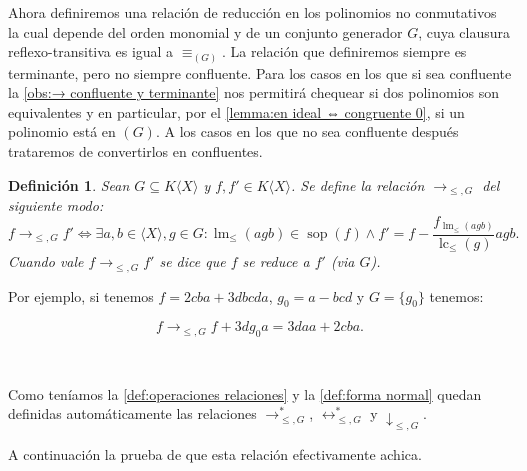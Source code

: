 \documentclass[12pt]{report}
\theoremstyle{customstyle}
\newtheorem{definition}[theorem]{Definición}
\theoremstyle{factstyle}
\DeclareMathOperator{\sop}{sop}
\DeclareMathOperator{\lm}{lm}
\DeclareMathOperator{\lc}{lc}
\begin{document}
Ahora definiremos una relación de reducción en los polinomios no conmutativos la cual depende del orden monomial y de un conjunto generador $G$, cuya clausura reflexo-transitiva es igual a $≡_{(G)}$. La relación que definiremos siempre es terminante, pero no siempre confluente. Para los casos en los que si sea confluente la \cref{obs:→ confluente y terminante} nos permitirá chequear si dos polinomios son equivalentes y en particular, por el \cref{lemma:en ideal ⇔ congruente 0}, si un polinomio está en $(G)$. A los casos en los que no sea confluente después trataremos de convertirlos en confluentes.

\begin{definition}\label{def:reducciones}
  Sean $G ⊆ K⟨X⟩$ y $f, f' ∈ K⟨X⟩$. Se define la relación $→_{≤, G}$ del siguiente modo:
  \[ f →_{≤, G} f' ⇔ ∃a, b ∈ ⟨X⟩, g ∈ G : \lm_≤(agb) ∈ \sop(f) ∧ f' = f - \frac{f_{\lm_≤(agb)}}{\lc_≤(g)}agb \text{.} \]
  Cuando vale $f →_{≤, G}f'$ se dice que $f$ se reduce a $f'$ (via $G$).
\end{definition}

Por ejemplo, si tenemos $f = 2 cba + 3 dbcda$, $g_0 = a - bcd$ y $G = \{g_0\}$ tenemos:

\[f →_{≤, G} f + 3d g_0 a = 3 daa + 2 cba \text{.}\]

\

Como teníamos la \cref{def:operaciones relaciones} y la \cref{def:forma normal} quedan definidas automáticamente las relaciones $→^*_{≤, G}$, $↔^*_{≤, G}$ y $↓_{≤, G}$.

A continuación la prueba de que esta relación efectivamente achica.
\end{document}
